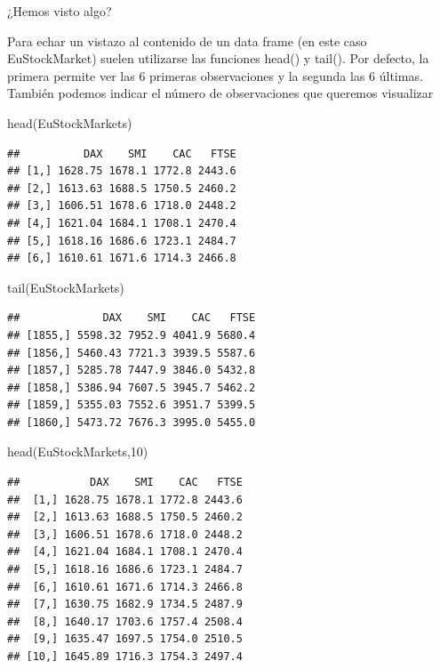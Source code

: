 \documentclass[
]{book}
\newenvironment{Shaded}{\begin{snugshade}}{\end{snugshade}}
\newcommand{\DecValTok}[1]{\textcolor[rgb]{0.00,0.00,0.81}{#1}}
\newcommand{\FunctionTok}[1]{\textcolor[rgb]{0.00,0.00,0.00}{#1}}
\newcommand{\NormalTok}[1]{#1}
\begin{document}
¿Hemos visto algo?

Para echar un vistazo al contenido de un data frame (en este caso EuStockMarket) suelen utilizarse las funciones head() y tail(). Por defecto, la primera permite ver las 6 primeras observaciones y la segunda las 6 últimas. También podemos indicar el número de observaciones que queremos visualizar

\begin{Shaded}
\begin{Highlighting}[]
\FunctionTok{head}\NormalTok{(EuStockMarkets)}
\end{Highlighting}
\end{Shaded}

\begin{verbatim}
##          DAX    SMI    CAC   FTSE
## [1,] 1628.75 1678.1 1772.8 2443.6
## [2,] 1613.63 1688.5 1750.5 2460.2
## [3,] 1606.51 1678.6 1718.0 2448.2
## [4,] 1621.04 1684.1 1708.1 2470.4
## [5,] 1618.16 1686.6 1723.1 2484.7
## [6,] 1610.61 1671.6 1714.3 2466.8
\end{verbatim}

\begin{Shaded}
\begin{Highlighting}[]
\FunctionTok{tail}\NormalTok{(EuStockMarkets)}
\end{Highlighting}
\end{Shaded}

\begin{verbatim}
##             DAX    SMI    CAC   FTSE
## [1855,] 5598.32 7952.9 4041.9 5680.4
## [1856,] 5460.43 7721.3 3939.5 5587.6
## [1857,] 5285.78 7447.9 3846.0 5432.8
## [1858,] 5386.94 7607.5 3945.7 5462.2
## [1859,] 5355.03 7552.6 3951.7 5399.5
## [1860,] 5473.72 7676.3 3995.0 5455.0
\end{verbatim}

\begin{Shaded}
\begin{Highlighting}[]
\FunctionTok{head}\NormalTok{(EuStockMarkets,}\DecValTok{10}\NormalTok{)}
\end{Highlighting}
\end{Shaded}

\begin{verbatim}
##           DAX    SMI    CAC   FTSE
##  [1,] 1628.75 1678.1 1772.8 2443.6
##  [2,] 1613.63 1688.5 1750.5 2460.2
##  [3,] 1606.51 1678.6 1718.0 2448.2
##  [4,] 1621.04 1684.1 1708.1 2470.4
##  [5,] 1618.16 1686.6 1723.1 2484.7
##  [6,] 1610.61 1671.6 1714.3 2466.8
##  [7,] 1630.75 1682.9 1734.5 2487.9
##  [8,] 1640.17 1703.6 1757.4 2508.4
##  [9,] 1635.47 1697.5 1754.0 2510.5
## [10,] 1645.89 1716.3 1754.3 2497.4
\end{verbatim}
\end{document}
